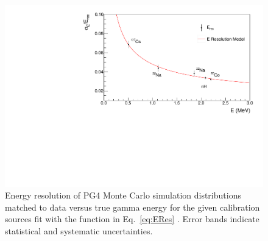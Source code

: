 \begin{figure}[h]
	\centering
	\includegraphics[width=0.7\linewidth]{tex/5-analysis-images/GammaRes}
	\caption[]{Energy resolution of PG4 Monte Carlo simulation distributions matched to data versus true gamma energy for the given calibration sources fit with the function in Eq.~\ref{eq:ERes} \cite{XZhang:2815}. Error bands indicate statistical and systematic uncertainties.}
	\label{fig:gammares}
\end{figure}



